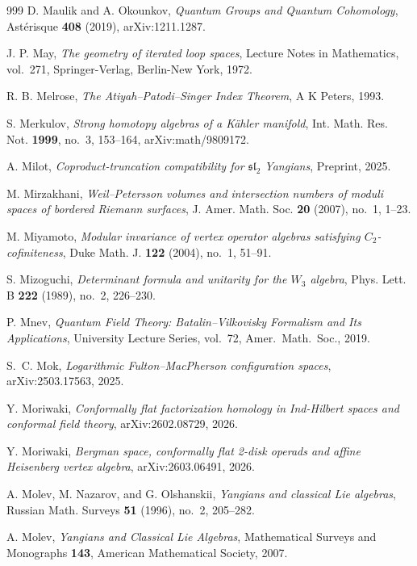 \begin{thebibliography}{999}
D. Maulik and A. Okounkov, \emph{Quantum Groups and Quantum Cohomology}, Ast\'erisque \textbf{408} (2019), arXiv:1211.1287.

J. P. May, \emph{The geometry of iterated loop spaces}, Lecture Notes in Mathematics, vol.~271, Springer-Verlag, Berlin-New York, 1972.

R. B. Melrose, \emph{The Atiyah--Patodi--Singer Index Theorem}, A K Peters, 1993.

S. Merkulov, \emph{Strong homotopy algebras of a K\"ahler manifold}, Int. Math. Res. Not. \textbf{1999}, no.~3, 153--164, arXiv:math/9809172.

A. Milot, \emph{Coproduct-truncation compatibility for $\mathfrak{sl}_2$ Yangians}, Preprint, 2025.

M. Mirzakhani, \emph{Weil--Petersson volumes and intersection numbers of moduli spaces of bordered Riemann surfaces}, J. Amer. Math. Soc. \textbf{20} (2007), no.~1, 1--23.

M. Miyamoto, \emph{Modular invariance of vertex operator algebras satisfying $C_2$-cofiniteness}, Duke Math. J. \textbf{122} (2004), no.~1, 51--91.

S. Mizoguchi, \emph{Determinant formula and unitarity for the $W_3$ algebra}, Phys. Lett. B \textbf{222} (1989), no.~2, 226--230.

P. Mnev, \emph{Quantum Field Theory: Batalin--Vilkovisky Formalism and Its Applications}, University Lecture Series, vol.~72, Amer.\ Math.\ Soc., 2019.

S.~C. Mok, \emph{Logarithmic Fulton--MacPherson configuration spaces}, arXiv:2503.17563, 2025.

Y. Moriwaki, \emph{Conformally flat factorization homology in Ind-Hilbert spaces and conformal field theory}, arXiv:2602.08729, 2026.

Y. Moriwaki, \emph{Bergman space, conformally flat 2-disk operads and affine Heisenberg vertex algebra}, arXiv:2603.06491, 2026.

A. Molev, M. Nazarov, and G. Olshanskii, \emph{Yangians and classical Lie algebras}, Russian Math. Surveys \textbf{51} (1996), no.~2, 205--282.

A. Molev, \emph{Yangians and Classical Lie Algebras}, Mathematical Surveys and Monographs \textbf{143}, American Mathematical Society, 2007.


\end{thebibliography}

